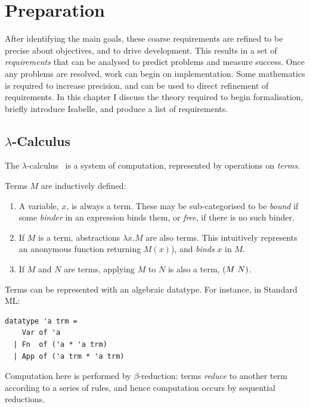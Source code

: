 \chapter{Preparation}
\label{chap:preparation}
After identifying the main goals, these coarse requirements are refined to be precise about objectives, and to drive development.
This results in a set of \emph{requirements} that can be analysed to predict problems and measure success.
Once any problems are resolved, work can begin on implementation.
Some mathematics is required to increase precision, and can be used to direct refinement of requirements.
In this chapter I discuss the theory required to begin formalisation, briefly introduce Isabelle, and produce a list of requirements.

\section{\(\lambda\)-Calculus}
\label{sec:lambda-intro}
The \(\lambda\)-calculus~\cite{lambda-overview} is a system of computation, represented by operations on \emph{terms}.
\begin{definition}
Terms \(M\) are inductively defined:
\begin{enumerate}
\item
A variable, \(x\), is always a term.
These may be sub-categorised to be \emph{bound} if some \emph{binder} in an expression binds them, or \emph{free}, if there is no such binder.
\item
If \(M\) is a term, abstractions \(\lambda x.M\) are also terms.
This intuitively represents an anonymous function returning \(M(x)\)), and \emph{binds} \(x\) in \(M\).
\item
If \(M\) and \(N\) are terms, applying \(M\) to \(N\) is also a term, \(\left(M\ N\right)\).
\end{enumerate}
\end{definition}

\noindent
Terms can be represented with an algebraic datatype.
For instance, in Standard ML:
\begin{verbatim}
datatype 'a trm =
    Var of 'a
  | Fn  of ('a * 'a trm)
  | App of ('a trm * 'a trm)
\end{verbatim}

Computation here is performed by \(\beta\)-reduction: terms \emph{reduce} to another term according to a series of rules, and hence computation occurs by sequential reductions.


